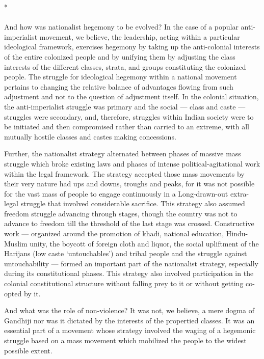 \begin{center}*\end{center}

\paragraph*{}
And how was nationalist hegemony to be evolved? In the case of a popular anti-imperialist movement, we believe, the leadership, acting within a particular ideological framework, exercises hegemony by taking up the anti-colonial interests of the entire colonized people and by unifying them by adjusting the class interests of the different classes, strata, and groups constituting the colonized people. The struggle for ideological hegemony within a national movement pertains to changing the relative balance of advantages flowing from such adjustment and not to the question of adjustment itself. In the colonial situation, the anti-imperialist struggle was primary and the social --- class and caste --- struggles were secondary, and, therefore, struggles within Indian society were to be initiated and then compromised rather than carried to an extreme, with all mutually hostile classes and castes making concessions.

Further, the nationalist strategy alternated between phases of massive mass struggle which broke existing laws and phases of intense political-agitational work within the legal framework. The strategy accepted those mass movements by their very nature had ups and downs, troughs and peaks, for it was not possible for the vast mass of people to engage continuously in a Long-drawn-out extra-legal struggle that involved considerable sacrifice. This strategy also assumed freedom struggle advancing through stages, though the country was not to advance to freedom till the threshold of the last stage was crossed. Constructive work --- organized around the promotion of khadi, national education, Hindu-Muslim unity, the boycott of foreign cloth and liquor, the social upliftment of the Harijans (low caste `untouchables') and tribal people and the struggle against untouchability --- formed an important part of the nationalist strategy, especially during its constitutional phases. This strategy also involved participation in the colonial constitutional structure without falling prey to it or without getting co-opted by it.

And what was the role of non-violence? It was not, we believe, a mere dogma of Gandhiji nor was it dictated by the interests of the propertied classes. It was an essential part of a movement whose strategy involved the waging of a hegemonic struggle based on a mass movement which mobilized the people to the widest possible extent.

